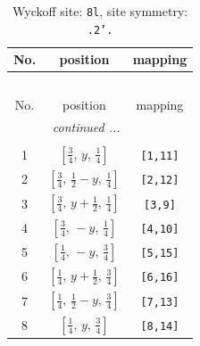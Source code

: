 \documentclass[fleqn,8pt]{jsarticle}
\begin{document}
\begin{longtable}{ccc}
\caption{Wyckoff site: {\tt 8l}, site symmetry: {\tt .2'.}}
 \\
 \hline \hline
No. & position & mapping \\ \hline \endfirsthead

\multicolumn{2}{l}{\tablename\ \thetable{}} \\
 \hline \hline
No. & position & mapping \\ \hline \endhead

 \hline \hline
\multicolumn{2}{r}{\footnotesize\it continued ...} \\ \endfoot

 \hline \hline
\multicolumn{2}{r}{} \\ \endlastfoot

1 & $\left[ \frac{3}{4},\, y,\, \frac{1}{4} \right]$ & {\tt [1,11]} \\ \hline
2 & $\left[ \frac{3}{4},\, \frac{1}{2} - y,\, \frac{1}{4} \right]$ & {\tt [2,12]} \\ \hline
3 & $\left[ \frac{3}{4},\, y + \frac{1}{2},\, \frac{1}{4} \right]$ & {\tt [3,9]} \\ \hline
4 & $\left[ \frac{3}{4},\, - y,\, \frac{1}{4} \right]$ & {\tt [4,10]} \\ \hline
5 & $\left[ \frac{1}{4},\, - y,\, \frac{3}{4} \right]$ & {\tt [5,15]} \\ \hline
6 & $\left[ \frac{1}{4},\, y + \frac{1}{2},\, \frac{3}{4} \right]$ & {\tt [6,16]} \\ \hline
7 & $\left[ \frac{1}{4},\, \frac{1}{2} - y,\, \frac{3}{4} \right]$ & {\tt [7,13]} \\ \hline
8 & $\left[ \frac{1}{4},\, y,\, \frac{3}{4} \right]$ & {\tt [8,14]} \\
\end{longtable}
\renewcommand{\arraystretch}{1.2}
\end{document}
